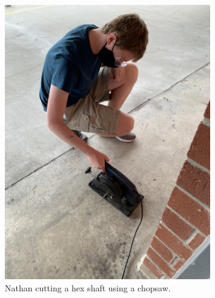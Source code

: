 \begin{figure}[htp]
\centering
  \includegraphics[width=0.8\textwidth]{Meetings/September/09-28-21/9-28-21_Hardware_Image5 - Nathan Forrer.jpg}
  \caption{Nathan cutting a hex shaft using a chopsaw.}
  \label{fig:pic5}
\end{figure}